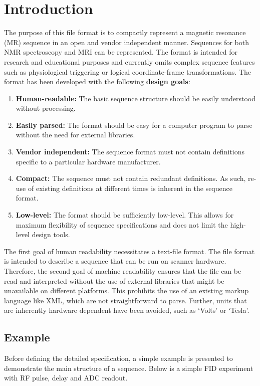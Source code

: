 \documentclass{article}
\begin{document}
\section{Introduction}
The purpose of this file format is to compactly represent a magnetic resonance (MR) sequence in an open and vendor independent manner. Sequences for both NMR spectroscopy and MRI can be represented. The format is intended for research and educational purposes and currently omits complex sequence features such as physiological triggering or logical coordinate-frame transformations. The format has been developed with the following \textbf{design goals}:
\begin{enumerate}
\item \textbf{Human-readable:} The basic sequence structure should be easily understood without processing.
\item \textbf{Easily parsed:} The format should be easy for a computer program to parse without the need for external libraries.
\item \textbf{Vendor independent:} The sequence format must not contain definitions specific to a particular hardware manufacturer.
\item \textbf{Compact:} The sequence must not contain redundant definitions. As such, re-use of existing definitions at different times is inherent in the sequence format.
\item \textbf{Low-level:} The format should be sufficiently low-level. This allows for maximum flexibility of sequence specifications and does not limit the high-level design tools.
\end{enumerate}

The first goal of human readability necessitates a text-file format. The file format is intended to describe a sequence that can be run on scanner hardware. Therefore, the second goal of machine readability ensures that the file can be read and interpreted without the use of external libraries that might be unavailable on different platforms. This prohibits the use of an existing markup language like XML, which are not straightforward to parse. Further, units  that are inherently hardware dependent have been avoided, such as `Volts' or `Tesla'. 


\subsection{Example}

Before defining the detailed specification, a simple example is presented to demonstrate the main structure of a sequence. Below is a simple FID experiment with RF pulse, delay and ADC readout. 

\end{document}

